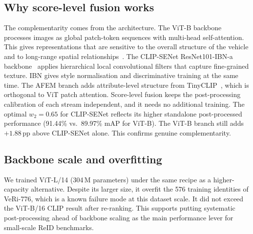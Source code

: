 \subsection{Why score-level fusion works}
The complementarity comes from the architecture. The ViT-B backbone processes images as global patch-token sequences with multi-head self-attention. This gives representations that are sensitive to the overall structure of the vehicle and to long-range spatial relationships~\cite{he2021transreid,dosovitskiy2021vit}. The CLIP-SENet ResNet101-IBN-a backbone~\cite{pan2018ibn} applies hierarchical local convolutional filters that capture fine-grained texture. IBN gives style normalisation and discriminative training at the same time. The AFEM branch adds attribute-level structure from TinyCLIP~\cite{lu2025clipsenet}, which is orthogonal to ViT patch attention. Score-level fusion keeps the post-processing calibration of each stream independent, and it needs no additional training. The optimal $w_2{=}0.65$ for CLIP-SENet reflects its higher standalone post-processed performance (91.44\% vs.\ 89.97\% mAP for ViT-B). The ViT-B branch still adds $+1.88$\,pp above CLIP-SENet alone. This confirms genuine complementarity.

\subsection{Backbone scale and overfitting}
We trained ViT-L/14 (304\,M parameters) under the same recipe as a higher-capacity alternative. Despite its larger size, it overfit the 576 training identities of VeRi-776, which is a known failure mode at this dataset scale. It did not exceed the ViT-B/16 CLIP result after re-ranking. This supports putting systematic post-processing ahead of backbone scaling as the main performance lever for small-scale ReID benchmarks.
